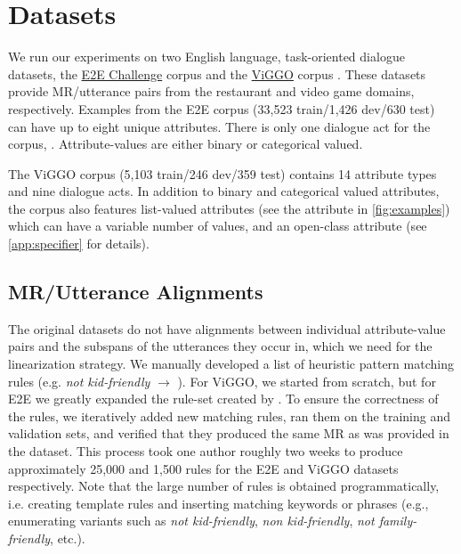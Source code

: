 \section{Datasets}

We run our experiments on two English language, task-oriented dialogue
datasets, the \href{http://www.macs.hw.ac.uk/InteractionLab/E2E/}{E2E
Challenge} corpus \cite{novikova2017} and the
\href{https://nlds.soe.ucsc.edu/viggo}{ViGGO} corpus \cite{juraska2019}. These
datasets provide MR/utterance pairs from the restaurant and video game
domains, respectively. Examples from the E2E corpus (33,523 train/1,426
dev/630 test) can have up to eight unique attributes.  There is only one
dialogue act for the corpus, .  Attribute-values are either binary
or categorical valued.

The ViGGO corpus (5,103 train/246 dev/359 test) contains 14 attribute types
and nine dialogue acts. %
In
addition to binary and categorical valued attributes, the corpus also features
list-valued attributes (see the  attribute in
\autoref{fig:examples}) which can have a variable number of values, and an
open-class  attribute (see \autoref{app:specifier} for details). 

\subsection{MR/Utterance Alignments} \label{sec:align}

The original datasets do not have alignments between individual
attribute-value pairs and the subspans of the utterances they occur in, which we
need for the  linearization strategy.  We manually developed a
list of heuristic pattern matching rules (e.g. \textit{not kid-friendly}
$\rightarrow$ ).  For ViGGO, we started from scratch,
but for E2E we greatly expanded the rule-set created by \citet{dusek2019}.  To
ensure the correctness of the rules, we iteratively added new matching rules,
ran them on the training and validation sets, and verified that they produced
the same MR as was provided in the dataset. This process took one author
roughly two weeks to produce approximately 25,000 and 1,500 rules for the E2E
and ViGGO datasets respectively. Note that the large number of rules is
obtained programmatically, i.e. creating template rules and inserting matching
keywords or phrases (e.g., enumerating variants such as \textit{not
kid-friendly}, \textit{non kid-friendly}, \textit{not family-friendly}, etc.).

